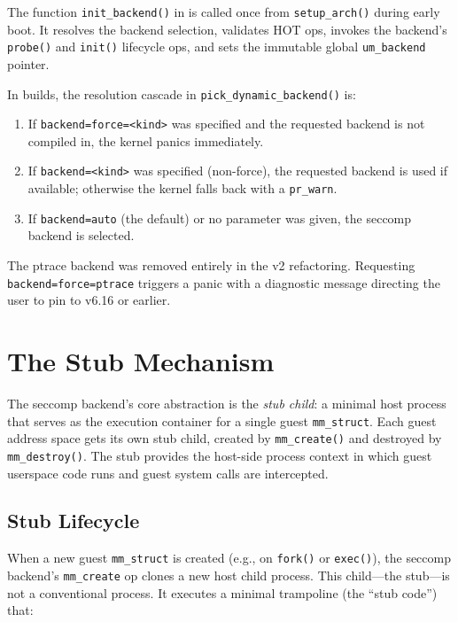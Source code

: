 The function \texttt{init\_backend()} in  is
called once from \texttt{setup\_arch()} during early boot.  It resolves the
backend selection, validates HOT ops, invokes the backend's \texttt{probe()}
and \texttt{init()} lifecycle ops, and sets the immutable global
\texttt{um\_backend} pointer.

In  builds, the resolution cascade in
\texttt{pick\_dynamic\_backend()} is:

\begin{enumerate}[leftmargin=2em]
\item If \texttt{backend=force=<kind>} was specified and the requested backend
  is not compiled in, the kernel panics immediately.
\item If \texttt{backend=<kind>} was specified (non-force), the requested
  backend is used if available; otherwise the kernel falls back with a
  \texttt{pr\_warn}.
\item If \texttt{backend=auto} (the default) or no parameter was given, the
  seccomp backend is selected.
\end{enumerate}

The ptrace backend was removed entirely in the v2 refactoring.  Requesting
\texttt{backend=force=ptrace} triggers a panic with a diagnostic message
directing the user to pin to v6.16 or earlier.


\section{The Stub Mechanism}
\label{sec:stub-mechanism}

The seccomp backend's core abstraction is the \emph{stub child}: a minimal
host process that serves as the execution container for a single guest
\texttt{mm\_struct}.  Each guest address space gets its own stub child, created
by \texttt{mm\_create()} and destroyed by \texttt{mm\_destroy()}.  The stub
provides the host-side process context in which guest userspace code runs
and guest system calls are intercepted.

\subsection{Stub Lifecycle}

When a new guest \texttt{mm\_struct} is created (e.g., on \texttt{fork()} or
\texttt{exec()}), the seccomp backend's \texttt{mm\_create} op clones a new
host child process.  This child---the stub---is not a conventional process.  It
executes a minimal trampoline (the ``stub code'') that:

